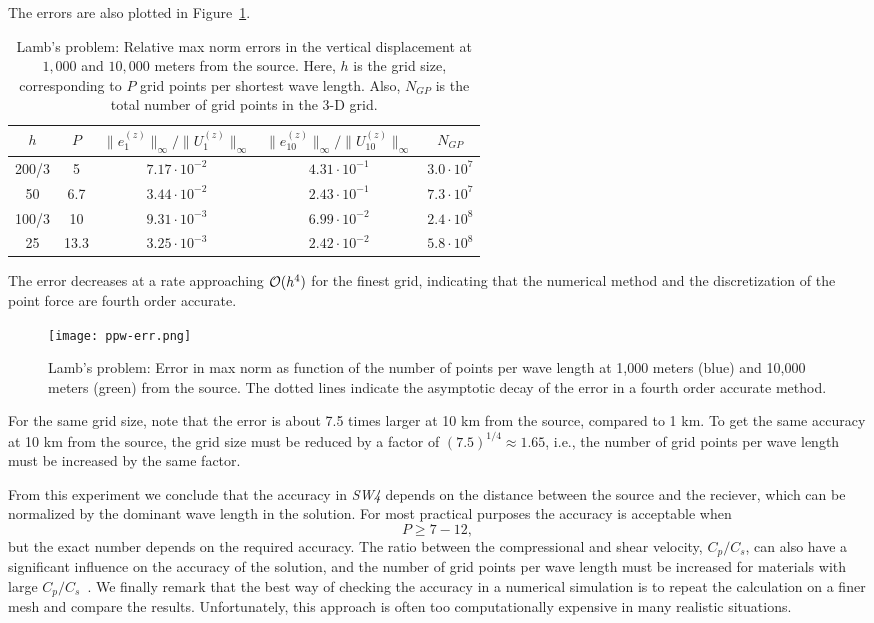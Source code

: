 \documentclass[11pt]{report}
\begin{document}
The errors are also plotted in Figure~\ref{fig:ppw-err}.
\begin{table}
\begin{center}
\begin{tabular}{| c | c | c | c | c |}
\hline
$h$ & $P$  & $\| e_1^{(z)}\|_\infty / \|U_1^{(z)}\|_\infty$  & $\| e_{10}^{(z)}\|_\infty /
\|U_{10}^{(z)}\|_\infty$ & $N_{GP}$ \\ \hline
 200/3 & 5   & $7.17\cdot 10^{-2}$  & $4.31\cdot 10^{-1}$ & $3.0\cdot 10^7$ \\ \hline
 50    & 6.7 & $3.44\cdot 10^{-2}$  & $2.43\cdot 10^{-1}$ & $7.3\cdot 10^7$ \\ \hline
 100/3 & 10  & $9.31\cdot 10^{-3}$  & $6.99\cdot 10^{-2}$ & $2.4\cdot 10^8$ \\ \hline
 25    & 13.3 & $3.25\cdot 10^{-3}$ & $2.42\cdot 10^{-2}$ & $5.8\cdot 10^8$ \\ \hline
\end{tabular}
\caption{Lamb's problem: Relative max norm errors in the vertical displacement at $1,000$ and
  $10,000$ meters from the source. Here, $h$ is the grid size, corresponding to $P$ grid points per
  shortest wave length. Also, $N_{GP}$ is the total number of grid points in the 3-D grid.}
\label{tab:lamb-err}
\end{center}
\end{table}
The error decreases at a rate approaching ${\cal O}(h^4)$ for the finest grid, indicating that the
numerical method and the discretization of the point force are fourth order accurate.
\begin{figure}[htp]
\begin{centering}
  \texttt{[image: ppw-err.png]}
  \caption{Lamb's problem: Error in max norm as function of the number of points per wave length at
    1,000 meters (blue) and 10,000 meters (green) from the source. The
    dotted lines indicate the asymptotic decay of the error in a fourth order accurate method.}
  \label{fig:ppw-err}
\end{centering}
\end{figure}
For the same grid size, note that the error is about 7.5 times larger at 10 km from the source,
compared to 1 km. To get the same accuracy at 10 km from the source, the grid size must be reduced
by a factor of $(7.5)^{1/4}\approx 1.65$, i.e., the number of grid points per wave length must be
increased by the same factor.

From this experiment we conclude that the accuracy in \emph{SW4} depends on the distance between the
source and the reciever, which can be normalized by the dominant wave length in the solution. For
most practical purposes the accuracy is acceptable when
\[
P \geq 7-12,
\]
but the exact number depends on the required accuracy. The ratio between the compressional and shear
velocity, $C_p/C_s$, can also have a significant influence on the accuracy of the solution, and the
number of grid points per wave length must be increased for materials with large
$C_p/C_s$~\cite{KrePet-12}. We finally remark that the best way of checking the accuracy in a
numerical simulation is to repeat the calculation on a finer mesh and compare the
results. Unfortunately, this approach is often too computationally expensive in many realistic
situations.
\end{document}

